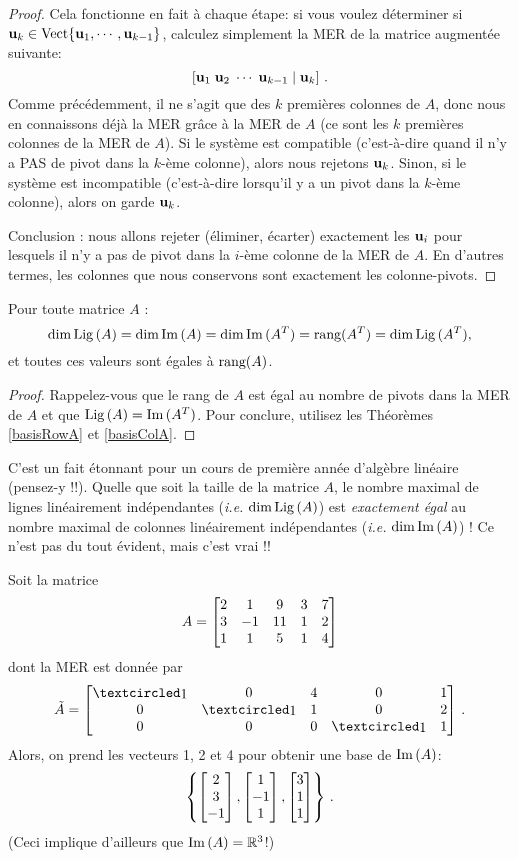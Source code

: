 \begin{proof}
Cela fonctionne en fait à chaque étape: si vous voulez déterminer si $\mathbf{u}_k \in \textrm{Vect}\{\mathbf{u}_1, \cdots, \mathbf{u}_{k-1}\}$, calculez simplement la MER de la matrice augment\'ee suivante:
$$
\left[ \mathbf{u}_1 \; \mathbf{u}_2 \; \cdots \; \mathbf{u}_{k-1} \;|\; \mathbf{u}_k \right]\,.
$$
Comme précédemment, il ne s'agit que des $k$ premières colonnes de $A$, donc nous en connaissons déjà la 
MER grâce à la MER de $A$ (ce sont les $k$ premières colonnes de la MER de $A$).  Si le système est 
compatible (c'est-à-dire quand il n'y a PAS de pivot dans la $k$-ème colonne), alors nous rejetons $\mathbf{u}_k$.
Sinon, si le système est incompatible (c'est-à-dire lorsqu'il y a un pivot dans la $k$-ème colonne), alors on garde $\mathbf{u}_k$.

Conclusion : nous allons rejeter (éliminer, écarter) exactement les $\mathbf{u}_i$ pour lesquels il n'y a pas de pivot dans la $i$-\`eme colonne de la MER de $A$.  En d'autres termes, les colonnes que nous conservons sont exactement les colonne-pivots.
\end{proof}

\begin{corollary}
Pour toute matrice $A$ :
$$
\dim \operatorname{Lig\,}(A) = \dim \operatorname{Im}\,(A) = \dim \operatorname{Im}\,(A^T) = \textrm{rang}(A^T) = \dim \operatorname{Lig\,}(A^T), 
$$ et toutes ces valeurs sont égales à $ \textrm{rang}(A)$.
\end{corollary}

\begin{proof}
Rappelez-vous que le rang de $A$ est \'egal au nombre de pivots dans la MER de $A$ 
et que $\operatorname{Lig\,}(A) = \operatorname{Im}\,(A^T)$. Pour conclure, utilisez les Théorèmes \ref{basisRowA} et \ref{basisColA}.
\end{proof}

C'est un fait étonnant pour un cours de première année d'algèbre linéaire (pensez-y !!). Quelle que soit la taille de la matrice $A$, le nombre maximal de lignes lin\'eairement indépendantes (\textit{i.e.} $\dim \operatorname{Lig\,}(A)$) est {\it exactement égal} au nombre maximal de colonnes lin\'eairement indépendantes (\textit{i.e.} $\dim \operatorname{Im}\,(A)$) ! Ce n'est pas du tout évident, mais c'est vrai  !\!!

\begin{myexample} Soit la matrice  
$$
A = \left[ \begin{matrix} 2&1&9&3&7\\3&-1&11&1&2\\1&1&5&1&4 \end{matrix} \right]
$$
dont la MER est donn\'ee par
$$
\tilde A = \mat{\pivot&0&4&0&1\\0&\pivot&1&0&2\\0&0&0&\pivot&1}\,.
$$
Alors, on prend les vecteurs 1, 2 et 4 pour obtenir une base de $\operatorname{Im}\,(A)$:
$$
\left\{ \left[ \begin{matrix} 2\\3\\-1 \end{matrix} \right], \left[ \begin{matrix} 1\\-1\\1 \end{matrix} \right], \left[ \begin{matrix} 3\\1\\1 \end{matrix} \right] \right\}\,.
$$
(Ceci implique d'ailleurs que $\operatorname{Im}\,(A)=\mathbb{R}^3$!)
\end{myexample}


